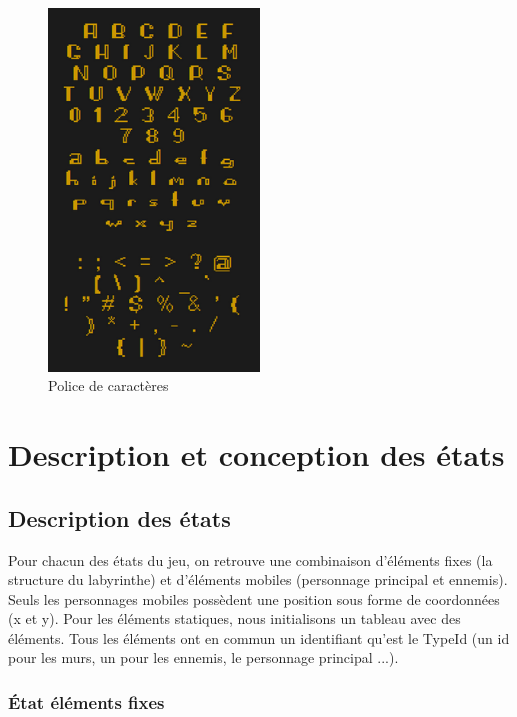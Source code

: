 \documentclass[a4paper,12pt]{article}
\begin{document}
\begin{figure}[h]
\begin{center}
\includegraphics[width=0.5\textwidth]{font.png}
\caption{\label{font}Police de caractères}
\end{center}
\end{figure}

\clearpage
\section{Description et conception des états}

\subsection{Description des états}

Pour chacun des états du jeu, on retrouve une combinaison d'éléments fixes (la structure du labyrinthe) et d'éléments mobiles (personnage principal et ennemis).
Seuls les personnages mobiles possèdent une position sous forme de coordonnées (x et y). Pour les éléments statiques, nous initialisons un tableau avec des éléments.
Tous les éléments ont en commun un identifiant qu'est le TypeId (un id pour les murs, un pour les ennemis, le personnage principal ...).

\subsubsection{État éléments fixes}
\end{document}

